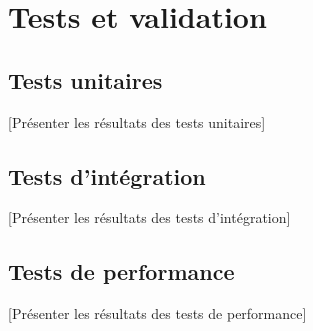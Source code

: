 \section{Tests et validation}

\subsection{Tests unitaires}
[Présenter les résultats des tests unitaires]

\subsection{Tests d'intégration}
[Présenter les résultats des tests d'intégration]

\subsection{Tests de performance}
[Présenter les résultats des tests de performance]

\vfill